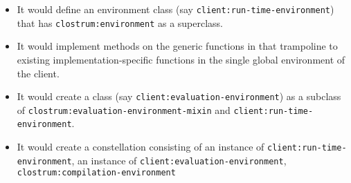 \begin{itemize}
\item It would define an environment class  (say
  \texttt{client:run-time-environment}) that has
  \texttt{clostrum:environment} as a superclass.
\item It would implement methods on the generic functions in
   that trampoline to existing
  implementation-specific functions in the single global environment
  of the client.
\item It would create a class (say
  \texttt{client:evaluation-environment}) as a subclass of
  \texttt{clostrum:evaluation-environment-mixin} and
  \texttt{client:run-time-environment}.
\item It would create a constellation consisting of an instance of
  \texttt{client:run-time-environment}, an instance of
  \texttt{client:evaluation-environment},
  \texttt{clostrum:compilation-environment}
\end{itemize}
